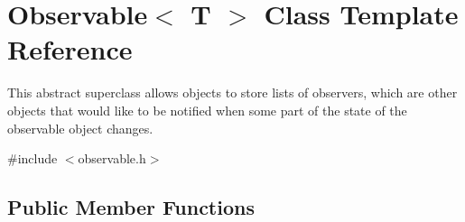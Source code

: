 \hypertarget{classObservable}{}\section{Observable$<$ T $>$ Class Template Reference}
\label{classObservable}


This abstract superclass allows objects to store lists of observers, which are other objects that would like to be notified when some part of the state of the observable object changes.  




{\ttfamily \#include $<$observable.\+h$>$}

\subsection*{Public Member Functions}
